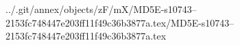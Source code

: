 ../.git/annex/objects/zF/mX/MD5E-s10743--2153fc748447e203ff11f49c36b3877a.tex/MD5E-s10743--2153fc748447e203ff11f49c36b3877a.tex